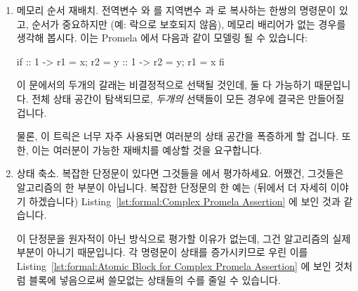 \begin{enumerate}
\item	메모리 순서 재배치.  전역변수  와  를 지역변수  과
	 로 복사하는 한쌍의 명령문이 있고, 순서가 중요하지만 (예: 락으로
	보호되지 않음), 메모리 배리어가 없는 경우를 생각해 봅시다.  이는
	Promela 에서 다음과 같이 모델링 될 수 있습니다:

\iffalse

\item	Memory reordering.  Suppose you have a pair of statements
	copying globals \co{x} and \co{y} to locals \co{r1} and \co{r2}, where
	ordering matters (e.g., unprotected by locks), but where you have no
	memory barriers.  This can be modeled in Promela as follows:

\fi

\begin{VerbatimN}[samepage=true]
if
:: 1 -> r1 = x;
        r2 = y
:: 1 -> r2 = y;
        r1 = x
fi
\end{VerbatimN}

	이  문에서의 두개의 갈래는 비결정적으로 선택될 것인데, 둘 다
	가능하기 때문입니다.
	전체 상태 공간이 탐색되므로, \emph{두개의} 선택들이 모든 경우에 결국은
	만들어질 겁니다.

	물론, 이 트릭은 너무 자주 사용되면 여러분의 상태 공간을 폭증하게 할
	겁니다.
	또한, 이는 여러분이 가능한 재배치를 예상할 것을 요구합니다.

\iffalse

	The two branches of the \co{if} statement will be selected
	nondeterministically, since they both are available.
	Because the full state space is searched, \emph{both} choices
	will eventually be made in all cases.

	Of course, this trick will cause your state space to explode
	if used too heavily.
	In addition, it requires you to anticipate possible reorderings.

\fi

\item	상태 축소.  복잡한 단정문이 있다면 그것들을  에서
	평가하세요.  어쨌건, 그것들은 알고리즘의 한 부분이 아닙니다.  복잡한
	단정문의 한 예는 (뒤에서 더 자세히 이야기 하겠습니다)
	Listing~\ref{lst:formal:Complex Promela Assertion} 에 보인 것과
	같습니다.

	이 단정문을 원자적이 아닌 방식으로 평가할 이유가 없는데, 그건
	알고리즘의 실제 부분이 아니기 때문입니다.
	각 명령문이 상태를 증가시키므로 우린 이를
	Listing~\ref{lst:formal:Atomic Block for Complex Promela Assertion}
	에 보인 것처럼  블록에 넣음으로써 쓸모없는 상태들의 수를
	줄일 수 있습니다.


\end{enumerate}
